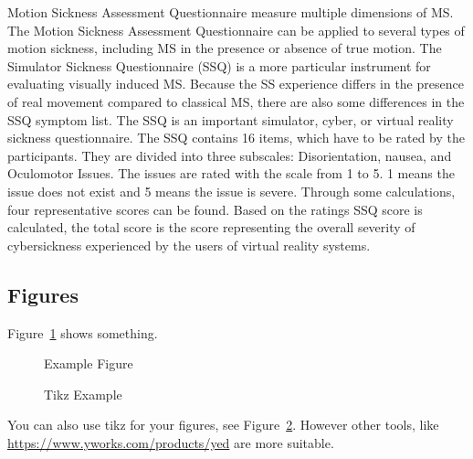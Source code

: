 Motion Sickness Assessment Questionnaire measure multiple dimensions of MS. The Motion Sickness Assessment Questionnaire can be applied to several types of motion sickness, including MS in the presence or absence of true motion. The Simulator Sickness Questionnaire (SSQ) is a more particular instrument for evaluating visually induced MS. Because the SS experience differs in the presence of real movement compared to classical MS, there are also some differences in the SSQ symptom list.
The SSQ is an important simulator, cyber, or virtual reality sickness questionnaire.
The SSQ contains 16 items, which have to be rated by the participants. They are divided into three subscales: Disorientation, nausea, and Oculomotor Issues. 
The issues are rated with the scale from 1 to 5. 1 means the issue does not exist and 5 means the issue is severe. Through some calculations, four representative scores can be found. Based on the ratings SSQ score is calculated, the total score is the score representing the overall severity of cybersickness experienced by the users of virtual reality systems.



\subsection{Figures}

Figure~\ref{fig:ex1} shows something.

\begin{figure}
    \centering
    \caption{Example Figure}
    \label{fig:ex1}
\end{figure}

\begin{figure}
    \begin{center}
    \end{center}
    \caption{Tikz Example}
    \label{pic:ex2}
\end{figure}
You can also use tikz for your figures, see Figure~\ref{pic:ex2}.
However other tools, like \url{https://www.yworks.com/products/yed} are more suitable.

